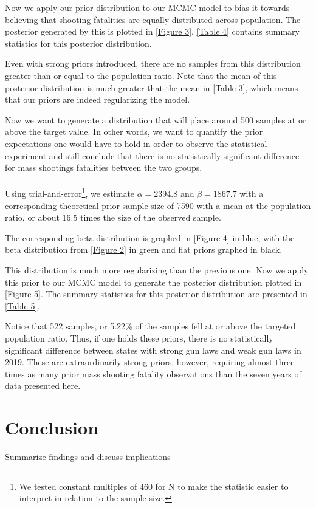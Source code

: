 \documentclass{article}
\begin{document}
Now we apply our prior distribution to our MCMC model to bias it towards believing that shooting fatalities are equally distributed across population. The posterior generated by this is plotted in \ref{Figure 3}. \ref{Table 4} contains summary statistics for this posterior distribution.

Even with strong priors introduced, there are no samples from this distribution greater than or equal to the population ratio. Note that the mean of this posterior distribution is much greater that the mean in \ref{Table 3}, which means that our priors are indeed regularizing the model. 

Now we want to generate a distribution that will place around 500 samples at or above the target value. In other words, we want to quantify the prior expectations one would have to hold in order to observe the statistical experiment and still conclude that there is no statistically significant difference for mass shootings fatalities between the two groups. 
\\
\\
Using trial-and-error\footnote{We tested constant multiples of 460 for N to make the statistic easier to interpret in relation to the sample size. }, we estimate $\alpha = 2394.8$ and $\beta = 1867.7$ with a corresponding theoretical prior sample size of 7590 with a mean at the population ratio, or about 16.5 times the size of the observed sample.

The corresponding beta distribution is graphed in \ref{Figure 4} in blue,  with the beta distribution from \ref{Figure 2} in green and flat priors graphed in black.  

This distribution is much more regularizing than the previous one. Now we apply this prior to our MCMC model to generate the posterior distribution plotted in \ref{Figure 5}. The summary statistics for this posterior distribution are presented in \ref{Table 5}.

Notice that 522 samples, or 5.22$\%$ of the samples fell at or above the targeted population ratio. Thus, if one holds these priors, there is no statistically significant difference between states with strong gun laws and weak gun laws in 2019. These are extraordinarily strong priors, however, requiring almost three times as many prior mass shooting fatality observations than the seven years of data presented here.

\section{Conclusion}
Summarize findings and discuss implications
\end{document}
